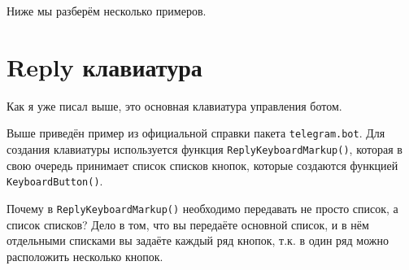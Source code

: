 \documentclass[
]{book}
\newenvironment{Shaded}{\begin{snugshade}}{\end{snugshade}}
\newcommand{\AttributeTok}[1]{\textcolor[rgb]{0.77,0.63,0.00}{#1}}
\newcommand{\CommentTok}[1]{\textcolor[rgb]{0.56,0.35,0.01}{\textit{#1}}}
\newcommand{\ConstantTok}[1]{\textcolor[rgb]{0.00,0.00,0.00}{#1}}
\newcommand{\FunctionTok}[1]{\textcolor[rgb]{0.00,0.00,0.00}{#1}}
\newcommand{\NormalTok}[1]{#1}
\newcommand{\OtherTok}[1]{\textcolor[rgb]{0.56,0.35,0.01}{#1}}
\newcommand{\SpecialCharTok}[1]{\textcolor[rgb]{0.00,0.00,0.00}{#1}}
\newcommand{\StringTok}[1]{\textcolor[rgb]{0.31,0.60,0.02}{#1}}
\begin{document}
Ниже мы разберём несколько примеров.

\hypertarget{reply-ux43aux43bux430ux432ux438ux430ux442ux443ux440ux430}{%
\section{Reply клавиатура}\label{reply-ux43aux43bux430ux432ux438ux430ux442ux443ux440ux430}}

Как я уже писал выше, это основная клавиатура управления ботом.

\begin{Shaded}
\end{Shaded}

Выше приведён пример из официальной справки пакета \texttt{telegram.bot}. Для создания клавиатуры используется функция \texttt{ReplyKeyboardMarkup()}, которая в свою очередь принимает список списков кнопок, которые создаются функцией \texttt{KeyboardButton()}.

Почему в \texttt{ReplyKeyboardMarkup()} необходимо передавать не просто список, а список списков? Дело в том, что вы передаёте основной список, и в нём отдельными списками вы задаёте каждый ряд кнопок, т.к. в один ряд можно расположить несколько кнопок.
\end{document}
